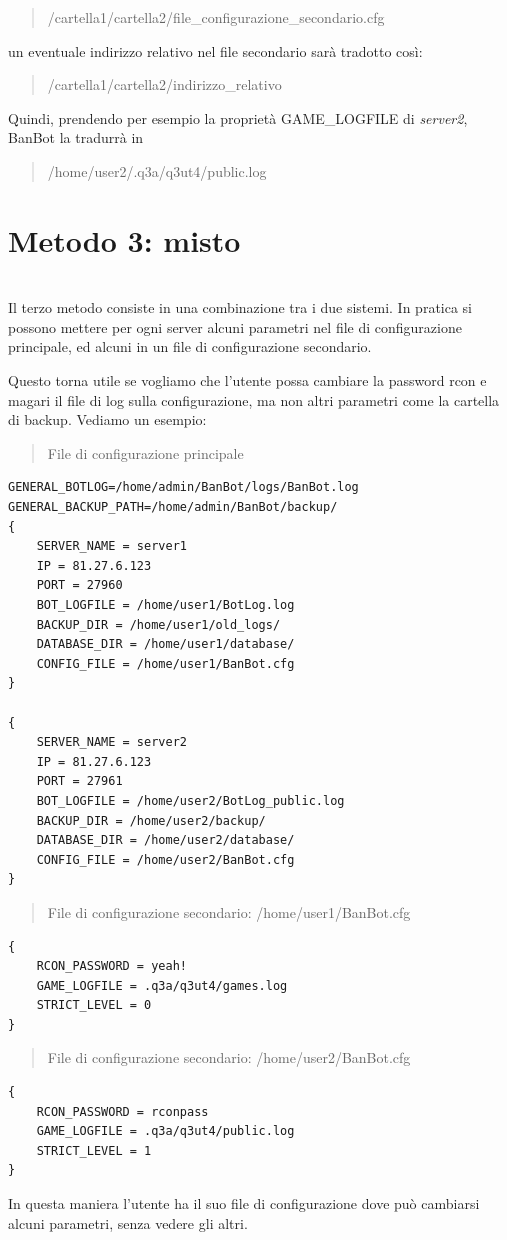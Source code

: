 \documentclass[a4paper]{article}
\begin{document}
\begin{quote}
/cartella1/cartella2/file\_configurazione\_secondario.cfg
\end{quote}
un eventuale indirizzo relativo nel file secondario sar\`a tradotto cos\`i:
\begin{quote}
/cartella1/cartella2/indirizzo\_relativo
\end{quote}
Quindi, prendendo per esempio la propriet\`a GAME\_LOGFILE di \textit{server2}, BanBot la tradurr\`a in
\begin{quote}
/home/user2/.q3a/q3ut4/public.log
\end{quote}

\chapter{\textbf{Metodo 3: misto}}\\
Il terzo metodo consiste in una combinazione tra i due sistemi. In pratica si possono mettere per ogni server alcuni parametri nel file di configurazione principale, ed alcuni in un file di configurazione secondario.

Questo torna utile se vogliamo che l'utente possa cambiare la password rcon e magari il file di log sulla configurazione, ma non altri parametri come la cartella di backup. Vediamo un esempio:
\begin{quote}
File di configurazione principale
\end{quote}
\begin{lstlisting}
GENERAL_BOTLOG=/home/admin/BanBot/logs/BanBot.log
GENERAL_BACKUP_PATH=/home/admin/BanBot/backup/
{
	SERVER_NAME = server1
	IP = 81.27.6.123
	PORT = 27960
	BOT_LOGFILE = /home/user1/BotLog.log
	BACKUP_DIR = /home/user1/old_logs/
	DATABASE_DIR = /home/user1/database/
	CONFIG_FILE = /home/user1/BanBot.cfg
}

{
	SERVER_NAME = server2
	IP = 81.27.6.123
	PORT = 27961
	BOT_LOGFILE = /home/user2/BotLog_public.log
	BACKUP_DIR = /home/user2/backup/
	DATABASE_DIR = /home/user2/database/
	CONFIG_FILE = /home/user2/BanBot.cfg
}
\end{lstlisting}
\begin{quote}
File di configurazione secondario: /home/user1/BanBot.cfg
\end{quote}
\begin{lstlisting}
{
	RCON_PASSWORD = yeah!
	GAME_LOGFILE = .q3a/q3ut4/games.log
	STRICT_LEVEL = 0
}
\end{lstlisting}
\begin{quote}
File di configurazione secondario: /home/user2/BanBot.cfg
\end{quote}
\begin{lstlisting}
{
	RCON_PASSWORD = rconpass
	GAME_LOGFILE = .q3a/q3ut4/public.log
	STRICT_LEVEL = 1
}
\end{lstlisting}
In questa maniera l'utente ha il suo file di configurazione dove pu\`o cambiarsi alcuni parametri, senza vedere gli altri.
\end{document}
